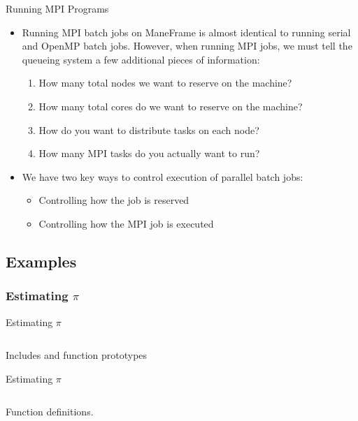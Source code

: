 \begin{frame}{Running MPI Programs}
\begin{itemize}
\item Running MPI batch jobs on ManeFrame is almost identical to running serial
      and OpenMP batch jobs. However, when running MPI jobs, we must tell the
      queueing system a few additional pieces of information:
\begin{enumerate}
\item How many total nodes we want to reserve on the machine?
\item How many total cores do we want to reserve on the machine?
\item How do you want to distribute tasks on each node?
\item How many MPI tasks do you actually want to run?
\end{enumerate}
\item We have two key ways to control execution of parallel batch jobs:
\begin{itemize}
\item Controlling how the job is reserved
\item Controlling how the MPI job is executed
\end{itemize}
\end{itemize}
\end{frame}

\subsection{Examples}
\subsubsection{Estimating \(\pi\)}

\begin{frame}{Estimating \(\pi\)}
\begin{listing}[H]
\inputminted[firstline=1, lastline=7]{C}{examples/mpi/mpi_monte_carlo_pi.c}
\caption{Includes and function prototypes}
\end{listing}
\end{frame}

\begin{frame}{Estimating \(\pi\)}
\begin{listing}[H]
\inputminted[firstline=35, lastline=48]{C}{examples/mpi/mpi_monte_carlo_pi.c}
\caption{Function definitions.}
\end{listing}
\end{frame}

